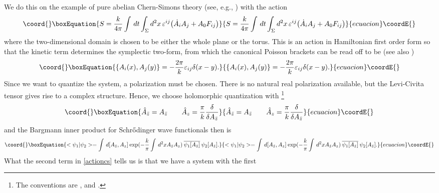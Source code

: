 \documentclass[a4paper,10pt]{article}
\begin{document}
We do this on the example of pure abelian Chern-Simons theory (see, e.g., \cite{Birm 91}) 
with the action
\begin{equation}\coord{}\boxEquation{\label{actioncs}
S=\frac{k}{4\pi}\int\,dt\int_{\Sigma} 
d^2x\,\varepsilon^{ij}\big(\dot{A}_i A_j + A_0 F_{ij}\big)
}{S=\frac{k}{4\pi}\int\,dt\int_{\Sigma} 
d^2x\,\varepsilon^{ij}\big(\dot{A}_i A_j + A_0 F_{ij}\big)
}{ecuacion}\coordE{}\end{equation}
where the two-dimensional domain \myHighlight{$\Sigma$}\coordHE{} is chosen to be either the whole plane or the 
torus. This is an action in Hamiltonian first order form so that the kinetic term 
determines the symplectic two-form, from which the canonical Poisson brackets can be read 
off to be (see also \cite{Fad 88,Jack 94})
\begin{equation}\coord{}\boxEquation{
\{A_i(x),A_j(y)\}=-\frac{2\pi}{k}\varepsilon_{ij}\delta(x-y).
}{
\{A_i(x),A_j(y)\}=-\frac{2\pi}{k}\varepsilon_{ij}\delta(x-y).
}{ecuacion}\coordE{}\end{equation}
Since we want to quantize the system, a polarization \cite{Wood 92} must be chosen. There 
is no natural real polarization available, but the Levi-Civita tensor \coordHE{} 
gives rise to a complex structure. Hence, we choose holomorphic quantization with 
\footnote{The conventions are \coordHE{}, \coordHE{} and \coordHE{}.}
\begin{equation}\coord{}\boxEquation{
\hat{A}_{\bar{z}}=A_{\bar{z}}\qquad \hat{A}_z=\frac{\pi}{k}\frac{\delta}{\delta 
A_{\bar{z}}}
}{
\hat{A}_{\bar{z}}=A_{\bar{z}}\qquad \hat{A}_z=\frac{\pi}{k}\frac{\delta}{\delta 
A_{\bar{z}}}
}{ecuacion}\coordE{}\end{equation}
and the Bargmann inner product for Schr\H odinger wave functionals 
\myHighlight{$\psi[A_{\bar{z}}]$}\coordHE{} then is 
\begin{equation}\coord{}\boxEquation{
<\psi_1|\psi_2>=\int \,d{[A_{\bar{z}},A_z]}\:\mathrm{exp}( -
\frac{k}{\pi}\int\,d^2x A_{\bar{z}}A_z)\:\overline{\psi_1[A_{\bar{z}}]}
\:\psi_2[A_{\bar{z}}].
}{
<\psi_1|\psi_2>=\int \,d{[A_{\bar{z}},A_z]}\:\mathrm{exp}( -
\frac{k}{\pi}\int\,d^2x A_{\bar{z}}A_z)\:\overline{\psi_1[A_{\bar{z}}]}
\:\psi_2[A_{\bar{z}}].
}{ecuacion}\coordE{}\end{equation}
What the second term in \eqref{actioncs} tells us is that we have a system with the first 
\end{document}
